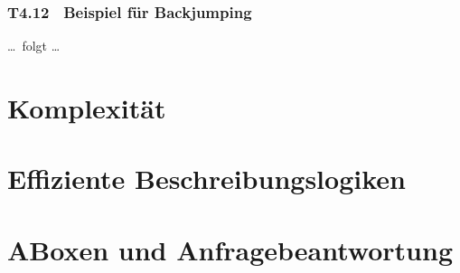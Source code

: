 \documentclass[fontsize=11pt, twoside=false, numbers=autoenddot]{scrbook}
\begin{document}
\goodbreak

\section*{T4.12~ Beispiel für Backjumping}

\dots\ folgt \dots

\part{Komplexität}

\part{Effiziente Beschreibungslogiken}

\part{ABoxen und Anfragebeantwortung}


%

\pagebreak
{}


\end{document}
